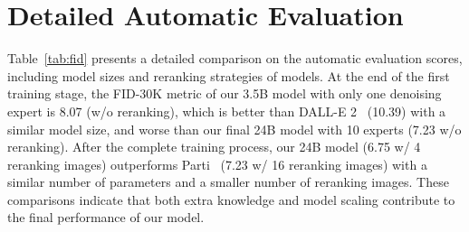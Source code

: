 \documentclass[10pt,twocolumn,letterpaper]{article}
\begin{document}
\section{Detailed Automatic Evaluation}\label{sec:detailed_fid}

Table~\ref{tab:fid} presents a detailed comparison on the automatic evaluation scores,  including model sizes and reranking strategies of models.
At the end of the first training stage, the FID-30K metric of our 3.5B model with only one denoising expert is 8.07 (w/o reranking), which is better than DALL-E 2~\cite{DBLP:journals/corr/abs-2204-06125} (10.39) with a similar model size, and worse than our final 24B model with 10 experts (7.23 w/o reranking). 
After the complete training process, our 24B model (6.75 w/ 4 reranking images) outperforms Parti~\cite{DBLP:journals/corr/abs-2206-10789} (7.23 w/ 16 reranking images) with a similar number of parameters and a smaller number of reranking images.
These comparisons indicate that both extra knowledge and model scaling contribute to the final performance of our model.
\end{document}
